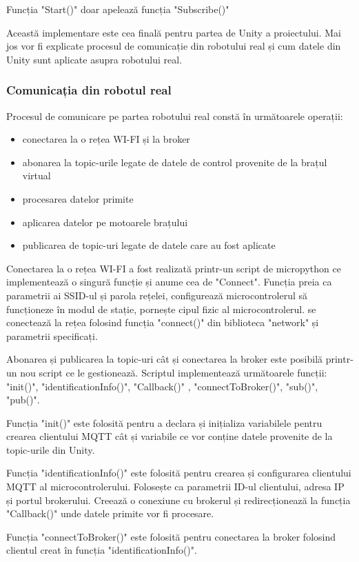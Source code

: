 Funcția "Start()" doar apelează funcția "Subscribe()"


Această implementare este cea finală pentru partea de Unity a proiectului. Mai jos vor fi explicate procesul de comunicație din robotului real și cum datele din Unity sunt aplicate asupra robotului real.

\subsubsection{Comunicația din robotul real}
Procesul de comunicare pe partea robotului real constă în următoarele operații:
\begin{itemize}
	\item conectarea la o rețea WI-FI și la broker
	\item abonarea la topic-urile legate de datele de control provenite de la brațul virtual
	\item procesarea datelor primite
	\item aplicarea datelor pe motoarele brațului
	\item publicarea de topic-uri legate de datele care au fost aplicate
\end{itemize}
Conectarea la o rețea WI-FI a fost realizată printr-un script de micropython ce implementează o singură funcție și anume cea de "Connect". Funcția preia ca parametrii ai SSID-ul și parola rețelei, configurează microcontrolerul să funcționeze în modul de stație, pornește cipul fizic al microcontrolerul. se conectează la rețea folosind funcția "connect()" din biblioteca "network" și parametrii specificați.


Abonarea și publicarea la topic-uri cât și conectarea la broker este posibilă printr-un nou script ce le gestionează. Scriptul implementează următoarele funcții: "init()", "identificationInfo()", "Callback()" , "connectToBroker()", "sub()", "pub()".


Funcția "init()" este folosită pentru a declara și inițializa variabilele pentru crearea clientului MQTT cât și variabile ce vor conține datele provenite de la topic-urile din Unity.


Funcția "identificationInfo()" este folosită pentru crearea și configurarea clientului MQTT al microcontrolerului. Folosește ca parametrii ID-ul clientului, adresa IP și portul brokerului. Creează o conexiune cu brokerul și redirecționează la funcția "Callback()" unde datele primite vor fi procesare.


Funcția "connectToBroker()" este folosită pentru conectarea la broker folosind clientul creat în funcția "identificationInfo()".

